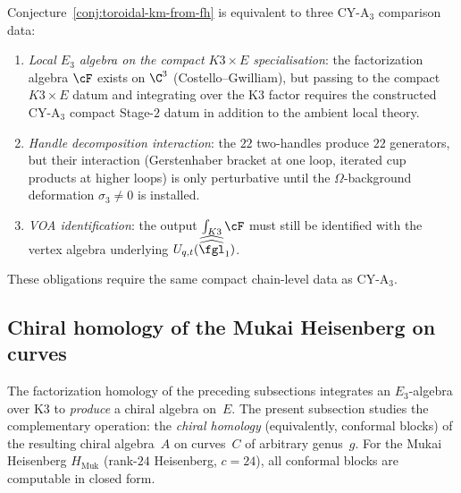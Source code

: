 \begin{remark}
\label{rem:fh-k3-cya3-obligations}
Conjecture~\ref{conj:toroidal-km-from-fh} is equivalent to three
CY-A$_3$ comparison data:
\begin{enumerate}[label=\textup{(\alph*)}]
\item \emph{Local $E_3$ algebra on the compact $K3\times E$ specialisation}: the factorization algebra $\cF$ exists on $\C^3$ (Costello--Gwilliam), but passing to the compact $K3\times E$ datum and integrating over the K3 factor requires the constructed CY-A$_3$ compact Stage-$2$ datum in addition to the ambient local theory.
\item \emph{Handle decomposition interaction}: the $22$ two-handles produce $22$ generators, but their interaction (Gerstenhaber bracket at one loop, iterated cup products at higher loops) is only perturbative until the $\Omega$-background deformation $\sigma_3 \neq 0$ is installed.
\item \emph{VOA identification}: the output $\int_{K3} \cF$ must still be identified with the vertex algebra underlying $U_{q,t}(\widehat{\widehat{\fgl}}_1)$.
\end{enumerate}
These obligations require the same compact chain-level data as
CY-A$_3$.
\end{remark}


\subsection{Chiral homology of the Mukai Heisenberg on curves}
\label{subsec:chiral-homology-ran-k3}

The factorization homology of the preceding subsections integrates an $E_3$-algebra over K3 to \emph{produce} a chiral algebra on~$E$. The present subsection studies the complementary operation: the \emph{chiral homology} (equivalently, conformal blocks) of the resulting chiral algebra~$A$ on curves~$C$ of arbitrary genus~$g$. For the Mukai Heisenberg $H_{\mathrm{Muk}}$ (rank-$24$ Heisenberg, $c = 24$), all conformal blocks are computable in closed form.

